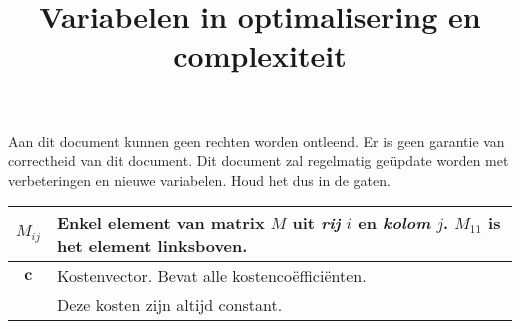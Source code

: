 \documentclass[10pt,a4paper]{article}
\title{Variabelen in optimalisering en complexiteit}
\author{}
\date{}
\begin{document}
\maketitle

Aan dit document kunnen geen rechten worden ontleend. Er is geen garantie van correctheid van dit document. Dit document zal regelmatig geüpdate worden met verbeteringen en nieuwe variabelen. Houd het dus in de gaten.


\begin{tabular}{|c|l|}
\hline
$M_{ij}$ & Enkel element van matrix $M$ uit \textit{rij} $i$ en \textit{kolom} $j$. $M_{11}$ is het element linksboven.\\
\hline 
$\textbf{c}$ & Kostenvector. Bevat alle kostencoëfficiënten.\\ & Deze kosten zijn altijd constant.\\ 


\end{tabular}
\end{document}
